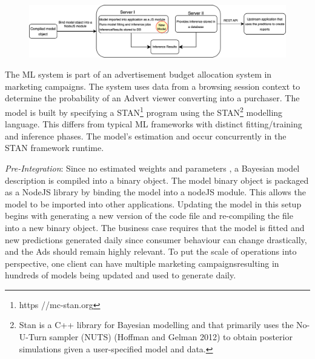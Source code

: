 \DIFaddbegin \begin{figure}[b]
\centering
\includegraphics[width=\linewidth]{images/case1_deployment_process.png}
\caption{}
\label{fig: case1_deployment_process}
\end{figure}
\DIFaddend 

The ML system is part of an advertisement budget allocation system in marketing campaigns. The system uses data from a browsing session context to determine the probability of an Advert viewer converting into a purchaser. The model is built by specifying a STAN\footnote{https \DIFdelbegin \DIFdel{:}\DIFdelend //mc-stan.org\DIFdelbegin \DIFdel{/}\DIFdelend } program using the STAN\footnote{Stan is a C++ library for Bayesian modelling and \DIFdelbegin {}\DIFdelend \DIFaddbegin {}\DIFaddend that primarily uses the No-U-Turn sampler (NUTS) (Hoffman and Gelman 2012) to obtain posterior simulations given a user-specified model and data.} modelling language. This \DIFdelbegin {}\DIFdelend \DIFaddbegin {}\DIFaddend differs from typical ML frameworks with distinct fitting/training and inference phases. The model's estimation and \DIFdelbegin {}\DIFdelend \DIFaddbegin {}\DIFaddend occur concurrently in the STAN framework runtime.

\textit{Pre-Integration}: Since \DIFdelbegin {}\DIFdelend no estimated weights and parameters \DIFdelbegin {}\DIFdelend \DIFaddbegin {}\DIFaddend , a Bayesian model description is compiled into a binary object. The model binary object is packaged as a NodeJS library by binding the model into a nodeJS module. This allows the model to be imported into other \DIFdelbegin {}\DIFdelend \DIFaddbegin {}\DIFaddend applications. Updating the model in this setup begins with generating a new version of the code file and re-compiling the file into a new binary object. The business case requires that the model is fitted and new predictions generated daily since consumer behaviour can change drastically, and the Ads should remain highly relevant. To put the scale of operations into perspective, one client can have multiple marketing campaigns\DIFaddbegin \DIFadd{, }\DIFaddend resulting in hundreds of models being updated and used to generate \DIFdelbegin {}\DIFdelend \DIFaddbegin {}\DIFaddend daily.

